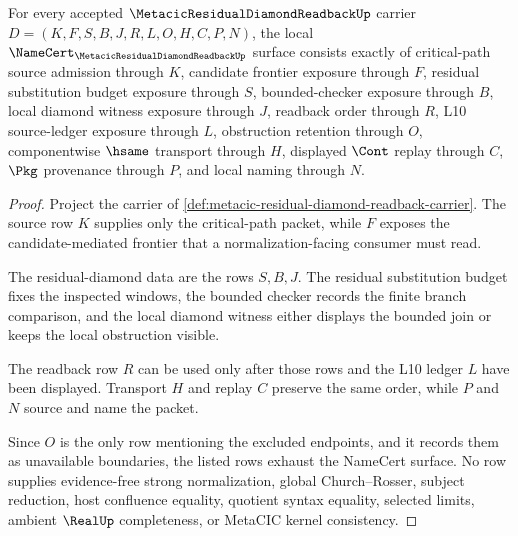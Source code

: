 \begin{theorem}
\label{thm:metacic-residual-diamond-readback-obligations}
For every accepted $\MetacicResidualDiamondReadbackUp$ carrier $D=(K,F,S,B,J,R,L,O,H,C,P,N)$, the local $\NameCert_{\MetacicResidualDiamondReadbackUp}$ surface consists exactly of critical-path source admission through $K$, candidate frontier exposure through $F$, residual substitution budget exposure through $S$, bounded-checker exposure through $B$, local diamond witness exposure through $J$, readback order through $R$, L10 source-ledger exposure through $L$, obstruction retention through $O$, componentwise $\hsame$ transport through $H$, displayed $\Cont$ replay through $C$, $\Pkg$ provenance through $P$, and local naming through $N$.
\end{theorem}
\begin{proof}
Project the carrier of \autoref{def:metacic-residual-diamond-readback-carrier}. The source row $K$ supplies only the critical-path packet, while $F$ exposes the candidate-mediated frontier that a normalization-facing consumer must read.

The residual-diamond data are the rows $S,B,J$. The residual substitution budget fixes the inspected windows, the bounded checker records the finite branch comparison, and the local diamond witness either displays the bounded join or keeps the local obstruction visible.

The readback row $R$ can be used only after those rows and the L10 ledger $L$ have been displayed. Transport $H$ and replay $C$ preserve the same order, while $P$ and $N$ source and name the packet.

Since $O$ is the only row mentioning the excluded endpoints, and it records them as unavailable boundaries, the listed rows exhaust the NameCert surface. No row supplies evidence-free strong normalization, global Church--Rosser, subject reduction, host confluence equality, quotient syntax equality, selected limits, ambient $\RealUp$ completeness, or MetaCIC kernel consistency.
\end{proof}

